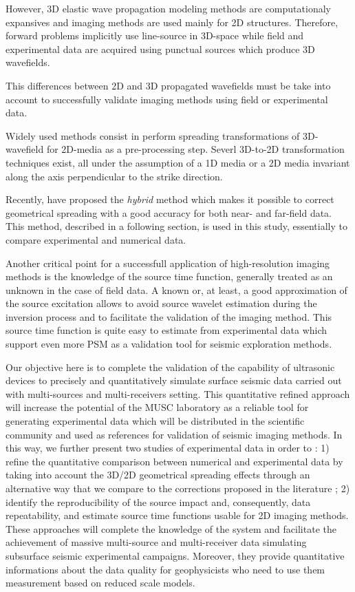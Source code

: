 \documentclass[manuscript,revised]{geophysics}
\begin{document}
\noindent However, 3D elastic wave propagation modeling methods are computationaly expansives and imaging methods are used mainly for 2D structures. Therefore, forward problems implicitly use line-source in 3D-space while field and experimental data are acquired using punctual sources which produce 3D wavefields.

\noindent This differences between 2D and 3D propagated wavefields must be take into account to successfully validate imaging methods using field or experimental data.

\noindent Widely used methods consist in perform spreading transformations of 3D-wavefield for 2D-media as a pre-processing step. Severl 3D-to-2D transformation techniques exist, all under the assumption of a 1D media or a 2D media invariant along the axis perpendicular to the strike direction.

\noindent Recently, \citet{Forbriger_LSS_2014} have proposed the \textit{hybrid} method which makes it possible to correct geometrical spreading with a good accuracy for both near- and far-field data. This method, described in a following section, is used in this study, essentially to compare experimental and numerical data. 

\noindent Another critical point for a successfull application of high-resolution imaging methods is the knowledge of the source time function, generally treated as an unknown in the case of field data. A known or, at least, a good approximation of the source excitation allows to avoid source wavelet estimation during the inversion process and to facilitate the validation of the imaging method. This source time function is quite easy to estimate from experimental data which support even more PSM as a validation tool for seismic exploration methods.

\noindent Our objective here is to complete the validation of the capability of ultrasonic devices to precisely and quantitatively simulate surface seismic data carried out with multi-sources and multi-receivers setting. This quantitative refined approach will increase the potential of the MUSC laboratory as a reliable tool for generating experimental data which will be distributed in the scientific community and used as references for validation of seismic imaging methods.
\noindent In this way, we further present two studies of experimental data in order to : 1) refine the quantitative comparison between numerical and experimental data by taking into account the 3D/2D geometrical spreading effects through an alternative way that we compare to the corrections proposed in the literature ; 2) identify the reproducibility of the source impact and, consequently, data repeatability, and estimate source time functions usable for 2D imaging methods. These approaches will complete the knowledge of the system and facilitate the achievement of massive multi-source and multi-receiver data simulating subsurface seismic experimental campaigns. Moreover, they provide quantitative informations about the data quality for geophysicists who need to use them measurement based on reduced scale models. 
\end{document}
